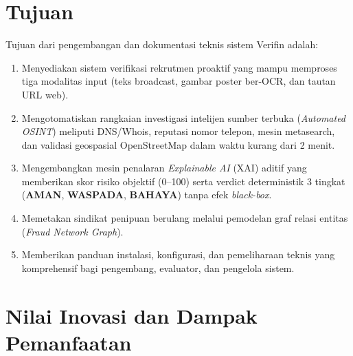 \documentclass[12pt,a4paper]{article}
\begin{document}
\section{Tujuan}
Tujuan dari pengembangan dan dokumentasi teknis sistem Verifin adalah:
\begin{enumerate}
    \item Menyediakan sistem verifikasi rekrutmen proaktif yang mampu memproses tiga modalitas input (teks broadcast, gambar poster ber-OCR, dan tautan URL web).
    \item Mengotomatiskan rangkaian investigasi intelijen sumber terbuka (\textit{Automated OSINT}) meliputi DNS/Whois, reputasi nomor telepon, mesin metasearch, dan validasi geospasial OpenStreetMap dalam waktu kurang dari 2 menit.
    \item Mengembangkan mesin penalaran \textit{Explainable AI} (XAI) aditif yang memberikan skor risiko objektif (0--100) serta verdict deterministik 3 tingkat (\textbf{AMAN}, \textbf{WASPADA}, \textbf{BAHAYA}) tanpa efek \textit{black-box}.
    \item Memetakan sindikat penipuan berulang melalui pemodelan graf relasi entitas (\textit{Fraud Network Graph}).
    \item Memberikan panduan instalasi, konfigurasi, dan pemeliharaan teknis yang komprehensif bagi pengembang, evaluator, dan pengelola sistem.
\end{enumerate}

\section{Nilai Inovasi dan Dampak Pemanfaatan}
\end{document}
